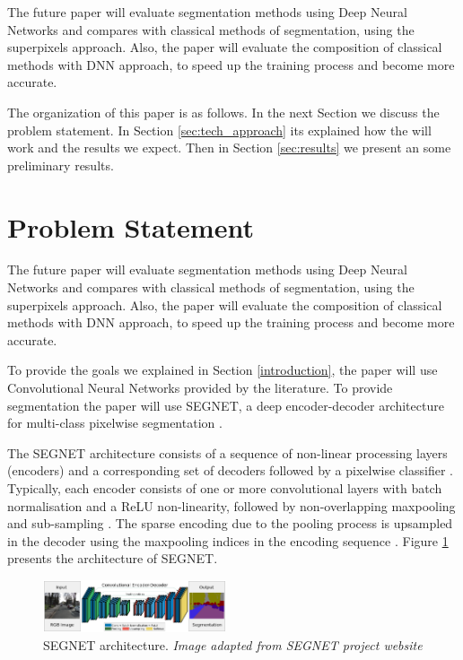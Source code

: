 \documentclass[10pt,twocolumn,letterpaper]{article}
\begin{document}
The future paper will evaluate segmentation methods using Deep Neural Networks and compares with classical methods of segmentation, using the superpixels approach. Also, the paper will evaluate the composition of classical methods with DNN approach, to speed up the training process and become more accurate.

The organization of this paper is as follows. In the next Section we discuss the problem statement. In Section \ref{sec:tech_approach} its explained how the will work and the results we expect. Then in Section \ref{sec:results} we present an some preliminary results.

\section{Problem Statement} \label{sec:prob_statement}

The future paper will evaluate segmentation methods using Deep Neural Networks and compares with classical methods of segmentation, using the superpixels approach. Also, the paper will evaluate the composition of classical methods with DNN approach, to speed up the training process and become more accurate.

To provide the goals we explained in Section \ref{introduction}, the paper will use Convolutional Neural Networks provided by the literature. To provide segmentation the paper will use SEGNET, a deep encoder-decoder architecture for multi-class pixelwise segmentation \cite{SEGNET}. 

The SEGNET architecture consists of a sequence of non-linear processing layers (encoders) and a corresponding set of decoders followed by a pixelwise classifier \cite{SEGNET} \cite{SEGNET_WEBSITE}. Typically, each encoder consists of one or more convolutional layers with batch normalisation and a ReLU non-linearity, followed by non-overlapping maxpooling and sub-sampling \cite{SEGNET} \cite{SEGNET_WEBSITE}. The sparse encoding due to the pooling process is upsampled in the decoder using the maxpooling indices in the encoding sequence \cite{SEGNET} \cite{SEGNET_WEBSITE}. Figure \ref{fig:segnet} presents the architecture of SEGNET.

\begin{figure}[ht]
  \centering
  \includegraphics[width=0.48\textwidth]{segnet.png}
  \caption{SEGNET architecture. \textit{Image adapted from SEGNET project website} \cite{SEGNET_WEBSITE} \cite{SEGNET}}
  \label{fig:segnet}
\end{figure}
\end{document}
